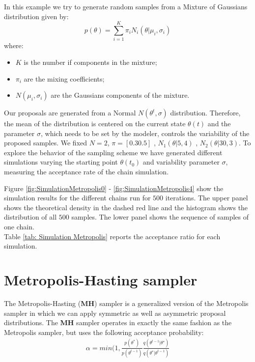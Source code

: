 \begin{example} \label{ex: Mixture of Gaussians Sampling}
In this example we try to generate random samples from a Mixture of Gaussians distribution given by:
$$
	p(\theta)=\sum_{i=1}^K \pi_i N_i(\theta | \mu_i,\sigma_i)
$$
where:
\begin{itemize}
\item $K$ is the number if components in the mixture;
\item $\pi_i$ are the mixing coefficients;
\item $N(\mu_i,\sigma_i)$ are the Gaussians components of the mixture.
\end{itemize}
Our proposals are generated from a Normal $N(\theta^t, \sigma)$ distribution. 
Therefore, the mean of the distribution is centered on the current state $\theta(t)$ and the parameter $\sigma$, which needs to be set by the modeler, controls the variability of the proposed samples.
We fixed $N=2$, $\pi=[0.3 0.5]$ , $N_1(\theta |5,4)$ , $N_2(\theta |30,3)$.
To explore the behavior of the sampling scheme we have generated different simulations varying the starting point $\theta(t_0)$ and  variability parameter $\sigma$, measuring the acceptance rate of the chain simulation.

Figure \ref{fig:SimulationMetropolis0} - \ref{fig:SimulationMetropolis4} show the simulation results for the different chains run for $500$ iterations.
The upper panel shows the theoretical density in the dashed red line and the histogram shows the distribution of all $500$ samples. The lower panel shows the sequence of samples of one chain.\\
Table \ref{tab: Simulation Metropolis} reports the acceptance ratio for each simulation.\\



\end{example}

\newpage

\section{Metropolis-Hasting sampler}
The Metropolis-Hasting (\textbf{MH}) sampler is a generalized version of the Metropolis sampler in which we can apply symmetric as well as asymmetric proposal distributions. The \textbf{MH} sampler operates in exactly the same fashion as the Metropolis sampler, but uses the following acceptance probability: 
\begin{eqnarray} \label{eqn: Acceptance Ratio MH}
\alpha = min(1, \frac{p(\theta^*)}{p(\theta^{t-1})} \frac{q(\theta^{t-1}|\theta^∗) }{q(\theta^∗ |\theta^{t-1})}
\end{eqnarray}

